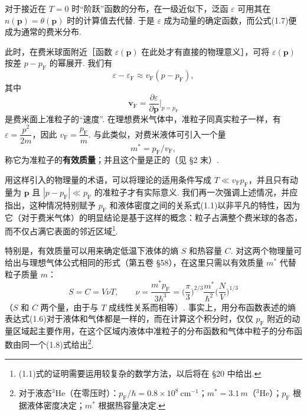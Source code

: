 对于接近在 $T=0$ 时“阶跃”函数的分布，在一级近似下，泛函 $\varepsilon$ 可用其在 $n(\bm p)=\theta(\bm p)$ 时的计算值去代替. 于是 $\varepsilon$ 成为动量的确定函数，而公式(1.7)便成为通常的费米分布.

此时，在费米球面附近［函数 $\varepsilon(\bm p)$ 在此处才有直接的物理意义］，可将 $\varepsilon(\bm p)$ 按差 $p-p_{\mathrm F}$ 的幂展开. 我们有
\begin{equation}
\varepsilon-\varepsilon_{\mathrm F}\approx v_{\mathrm F}(p-p_{\mathrm F}),
\end{equation}
其中
\begin{equation}
\bm v_{\mathrm F}=\frac{\partial\varepsilon}{\partial\bm p}\bigg|_{p=p_{\mathrm F}}
\end{equation}
是费米面上准粒子的“速度”. 在理想费米气体中，准粒子同真实粒子一样，有
$\varepsilon=\dfrac{p^{2}}{2m}$，因此 $v_{\mathrm F}=\dfrac{p_{\mathrm F}}{m}$. 与此类似，对费米液体可引入一个量
\begin{equation}
m^{*}=p_{\mathrm F}/v_{\mathrm F},
\end{equation}
称它为准粒子的\textbf{有效质量}；并且这个量是正的（见 §2 末）.

用这样引入的物理量的术语，可以将理论的适用条件写成 $T\ll v_{\mathrm F}p_{\mathrm F}$，并且只有动量为 $\bm p$ 且 $|p-p_{\mathrm F}|\ll p_{\mathrm F}$ 的准粒子才有实际意义. 我们再一次强调上述情况，并应指出，这种情况特别赋予 $p_{\mathrm F}$ 和液体密度之间的关系式(1.1)以非平凡的特性，因为它（对于费米气体）的明显结论是基于这样的概念：粒子占满整个费米球的各态，而不仅占满它表面的邻近区域\footnote{(1.1)式的证明需要运用较复杂的数学方法，以后将在 §20 中给出.}.

特别是，有效质量可以用来确定低温下液体的熵 $S$ 和热容量 $C$. 对这两个物理量可给出与理想气体公式相同的形式（第五卷 §58），在这里只需以有效质量 $m^{*}$ 代替粒子质量 $m$：
\begin{equation}
S=C=V\nu T,\qquad \nu=\frac{m^{*}p_{\mathrm F}}{3\hbar^{3}}=\biggl(\frac{\pi}{3}\biggr)^{2/3}\frac{m^{*}}{\hbar^{2}}\biggl(\frac{N}{V}\biggr)^{1/3}
\end{equation}
（$S$ 和 $C$ 两个量，由于与 $T$ 成线性关系而相等）. 事实上，用分布函数表述的熵表达式(1.6)对于液体和气体都是一样的，而在计算这个积分时，仅仅 $p_{\mathrm F}$ 附近的动量区域起主要作用，在这个区域内液体中准粒子的分布函数和气体中粒子的分布函数由同一个(1.8)式给出\footnote{对于液态$^{3}$He（在零压时）：$p_{\mathrm F}/\hbar=0.8\times10^{8}\ \mathrm{cm}^{-1}$；$m^{*}=3.1\,m$（$^{3}$He）；$p_{\mathrm F}$ 根据液体密度决定；$m^{*}$ 根据热容量决定.}.

